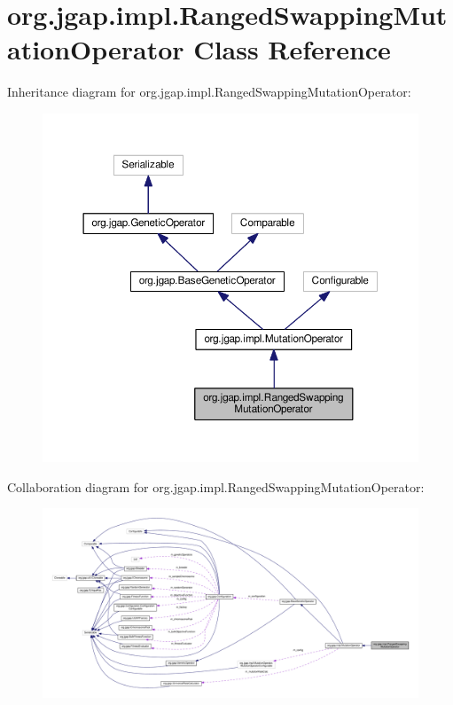 \hypertarget{classorg_1_1jgap_1_1impl_1_1_ranged_swapping_mutation_operator}{\section{org.\-jgap.\-impl.\-Ranged\-Swapping\-Mutation\-Operator Class Reference}
\label{classorg_1_1jgap_1_1impl_1_1_ranged_swapping_mutation_operator}
}


Inheritance diagram for org.\-jgap.\-impl.\-Ranged\-Swapping\-Mutation\-Operator\-:
\nopagebreak
\begin{figure}[H]
\begin{center}
\leavevmode
\includegraphics[width=350pt]{classorg_1_1jgap_1_1impl_1_1_ranged_swapping_mutation_operator__inherit__graph}
\end{center}
\end{figure}


Collaboration diagram for org.\-jgap.\-impl.\-Ranged\-Swapping\-Mutation\-Operator\-:
\nopagebreak
\begin{figure}[H]
\begin{center}
\leavevmode
\includegraphics[width=350pt]{classorg_1_1jgap_1_1impl_1_1_ranged_swapping_mutation_operator__coll__graph}
\end{center}
\end{figure}
